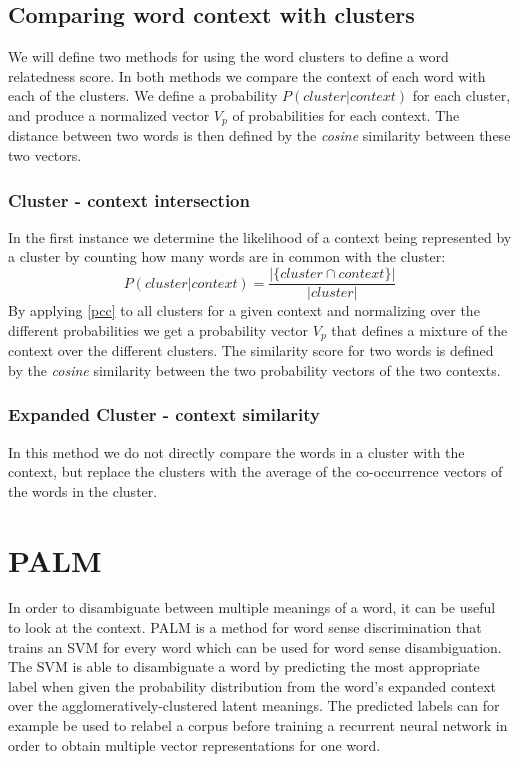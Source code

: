 \documentclass[11pt]{article}
\begin{document}
\subsection{Comparing word context with clusters}
We will define two methods for using the word clusters to define a word relatedness score. In both methods we compare the context of each word with each of the clusters. We define a probability $P( cluster | context )$ for each cluster, and produce a normalized vector $V_p$ of probabilities for each context. The distance between two words is then defined by the \textit{cosine} similarity between these two vectors.

\subsubsection{Cluster - context intersection}
In the first instance we determine the likelihood of a context being represented by a cluster by counting how many words are in common with the cluster:
\begin{equation} \label{pcc}P( \textit{cluster} | \textit{context}) = \frac{ | \{\textit{cluster} \cap \textit{context}\} |  }{| \textit{cluster} |} \end{equation}
By applying \ref{pcc} to all clusters for a given context and normalizing over the different probabilities we get a probability vector $V_{p}$ that defines a mixture of the context over the different clusters. The similarity score for two words is defined by the \textit{cosine} similarity between the two probability vectors of the two contexts.

\subsubsection{Expanded Cluster - context similarity}
In this method we do not directly compare the words in a cluster with the context, but replace the clusters with the average of the co-occurrence vectors of the words in the cluster.

\section{PALM}
In order to disambiguate between multiple meanings of a word, it can be useful to look at the context. PALM is a method for word sense discrimination that trains an SVM for every word which can be used for word sense disambiguation. The SVM is able to disambiguate a word by predicting the most appropriate label when given the probability distribution from the word's expanded context over the agglomeratively-clustered latent meanings. The predicted labels can for example be used to relabel a corpus before training a recurrent neural network in order to obtain multiple vector representations for one word. 
\end{document}
